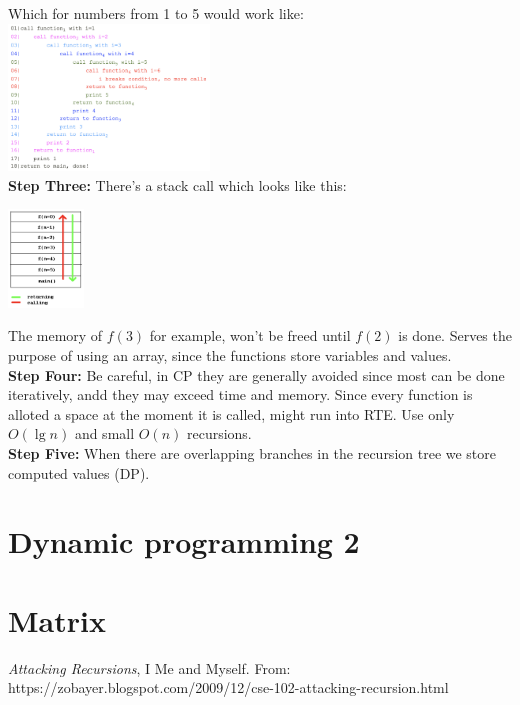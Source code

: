 \documentclass{IEEEtran}
\begin{document}
        Which for numbers from 1 to 5 would work like:\\
        \includegraphics[width=0.4\textwidth]{rofExecution.png}\\
        \textbf{Step Three:} There's a stack call which looks like this:\\
        \begin{center}
            \includegraphics[width=0.15\textwidth]{stackCalls.png}
        \end{center}
        The memory of $f(3)$ for example, won't be freed until $f(2)$ is done. Serves the purpose of using an array, since the functions store variables and values.\\
        \textbf{Step Four:} Be careful, in CP they are generally avoided since most can be done iteratively, andd they may exceed time and memory. Since every function is alloted a space at the moment it is called, might run into RTE. Use only $O(\lg{n})$ and small $O(n)$ recursions. \\
        \textbf{Step Five:} When there are overlapping branches in the recursion tree we store computed values (DP).
    \section{Dynamic programming 2}

    \section{Matrix}

    \begin{thebibliography}{}
            \textit{Attacking Recursions},
            I Me and Myself.
            From: https://zobayer.blogspot.com/2009/12/cse-102-attacking-recursion.html
    \end{thebibliography}
\end{document}
